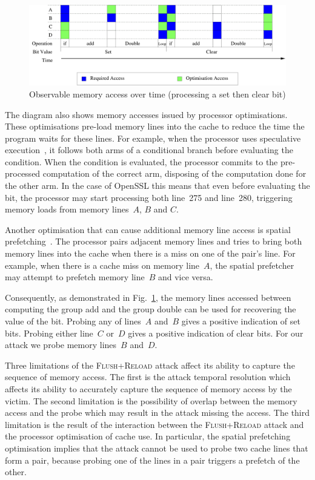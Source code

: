 \documentclass[twocolumn]{svjour3}
\begin{document}
\begin{figure}[htb]
\centering\includegraphics[width=\columnwidth]{images/temporal}
\caption{Observable memory access over time (processing a set then clear bit)\label{dgm:temporal}}
\end{figure}

The diagram also shows memory accesses issued by processor optimisations.
These optimisations pre-load memory lines into the cache to reduce the time the program waits for these lines.
For example, when the processor uses speculative execution~\cite{uht95disjoint}, it follows both arms of a conditional
branch before evaluating the condition.
When the condition is evaluated, the processor commits to the pre-processed computation of the correct arm,
disposing of the computation done for the other arm. 
In the case of OpenSSL this means that even before evaluating the bit, 
the processor may start processing both line~275 and line~280, triggering memory loads from memory lines~$A$, $B$ and $C$.

Another optimisation that can cause additional memory line access is spatial prefetching~\cite{intel12optimization}.
The processor pairs adjacent memory lines and tries to bring both memory lines into the cache
when there is a miss on one of the pair's line.
For example, when there is a cache miss on memory line~$A$, the spatial prefetcher may attempt to prefetch memory line~$B$
and vice versa.

Consequently, as demonstrated in Fig.~\ref{dgm:temporal}, the memory lines accessed between computing
the group add and the group double can be used for recovering the value of the bit.
Probing any of lines~$A$ and~$B$ gives a positive indication of set bits.  
Probing either line~$C$ or~$D$ gives a positive indication of clear bits.
For our attack we probe memory lines~$B$ and~$D$.

Three limitations of the \textsc{Flush+Reload} attack affect its ability to capture the sequence of memory access.
The first is the attack temporal resolution which affects its ability to accurately capture the sequence of memory access
by the victim.
The second limitation is the possibility of overlap between the memory access and the probe which may result
in the attack missing the access.
The third limitation is the result of the interaction between the \textsc{Flush+Reload} attack and the processor
optimisation of cache use.  
In particular, the spatial prefetching optimisation implies that the attack cannot be used to probe two cache lines that form a pair,
because probing one of the lines in a pair triggers a prefetch of the other.
\end{document}
